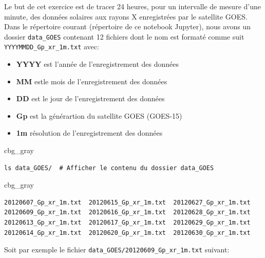 \documentclass[%
oneside,                 %
final,                   %
10pt,french]{article}
\newenvironment{_cod_tight}[1]{
   \def\FrameCommand{\colorbox{#1}}
   \FrameRule0.6pt\MakeFramed {\FrameRestore}\vskip3mm}
   {\vskip0mm\endMakeFramed}
\newenvironment{cod}[1]{
\bgroup\rmfamily
\fboxsep=0mm\relax
\begin{_cod_tight}{#1}
\list{}{\parsep=-2mm\parskip=0mm\topsep=0pt\leftmargin=2mm
\rightmargin=2\leftmargin\leftmargin=4pt\relax}
\item\relax}
{\endlist\end{_cod_tight}\egroup}
\newenvironment{doconceexercise}{}{}
\begin{document}
\begin{doconceexercise}
Le but de cet exercice est de tracer 24 heures, pour un intervalle de mesure d'une minute, des données solaires aux rayons X enregistrées par le satellite GOES. Dans le répertoire courant (répertoire de ce notebook Jupyter), nous avons un dossier \Verb!data_GOES! contenant 12 fichiers dont le nom est formaté comme suit \Verb!YYYYMMDD_Gp_xr_1m.txt! avec:

\begin{itemize}
\item \textbf{YYYY} est l'année de l'enregistrement des données

\item \textbf{MM} estle mois de l'enregistrement des données

\item \textbf{DD} est le jour de l'enregistrement des données

\item \textbf{Gp} est la générartion du satellite GOES (GOES-15)

\item \textbf{1m} résolution de l'enregistrement des données
\end{itemize}

\noindent
\begin{cod}{cbg_gray}\begin{verbatim}
ls data_GOES/  # Afficher le contenu du dossier data_GOES
\end{verbatim}
\end{cod}
\noindent

\begin{cod}{cbg_gray}\begin{verbatim}
20120607_Gp_xr_1m.txt  20120615_Gp_xr_1m.txt  20120627_Gp_xr_1m.txt
20120609_Gp_xr_1m.txt  20120616_Gp_xr_1m.txt  20120628_Gp_xr_1m.txt
20120613_Gp_xr_1m.txt  20120617_Gp_xr_1m.txt  20120629_Gp_xr_1m.txt
20120614_Gp_xr_1m.txt  20120620_Gp_xr_1m.txt  20120630_Gp_xr_1m.txt
\end{verbatim}
\end{cod}
\noindent



Soit par exemple le fichier \Verb!data_GOES/20120609_Gp_xr_1m.txt! suivant:


\end{doconceexercise}
\end{document}
